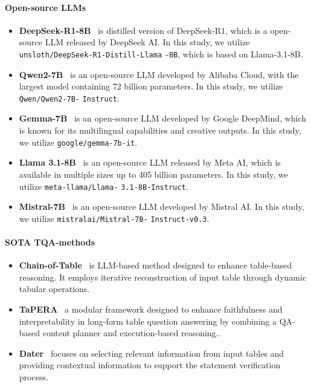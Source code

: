 \paragraph{Open-source LLMs}
\begin{itemize}[leftmargin=*,topsep=4pt,itemsep=4pt,parsep=0pt]

    \item\textbf{DeepSeek-R1-8B}~\citep{DeepSeekAI2025DeepSeekR1IR} is distilled version of DeepSeek-R1, which is a open-source LLM released by DeepSeek AI.
    In this study, we utilize \texttt{unsloth/DeepSeek-R1-Distill-Llama} \texttt{-8B}, which is based on Llama-3.1-8B.

    \item\textbf{Qwen2-7B}~\citep{Yang2024Qwen2TR} is an open-source LLM developed by Alibaba Cloud, with the largest model containing 72 billion parameters.
    In this study, we utilize \texttt{Qwen/Qwen2-7B-} \texttt{Instruct}.

    \item\textbf{Gemma-7B}~\citep{Mesnard2024GemmaOM} is an open-source LLM developed by Google DeepMind, which is known for its multilingual capabilities and creative outputs.
    In this study, we utilize \texttt{google/gemma-7b-it}.

    \item\textbf{Llama 3.1-8B}~\citep{llama-3} is an open-source LLM released by Meta AI, which is available in multiple sizes up to 405 billion parameters.
    In this study, we utilize \texttt{meta-llama/Llama-} \texttt{3.1-8B-Instruct}.

    \item\textbf{Mistral-7B}~\citep{Jiang2023Mistral7} is an open-source LLM developed by Mistral AI.
    In this study, we utilize \texttt{mistralai/Mistral-7B-} \texttt{Instruct-v0.3}.

\end{itemize}

\paragraph{SOTA TQA-methods}
\begin{itemize}[leftmargin=*,topsep=4pt,itemsep=4pt,parsep=0pt]

    \item\textbf{Chain-of-Table}~\citep{Wang2024ChainofTableET} is LLM-based method designed to enhance table-based reasoning.
    It employs iterative reconstruction of input table through dynamic tabular operations.

    \item\textbf{TaPERA}~\citep{zhao-etal-2024-tapera} a modular framework designed to enhance faithfulness and interpretability in long-form table question answering by combining a QA-based content planner and execution-based reasoning..

    \item\textbf{Dater}~\citep{Ye2023LargeLM} focuses on selecting relevant information from input tables and providing contextual information to support the statement verification process.

\end{itemize}

